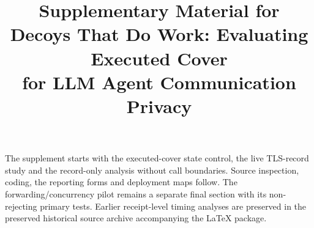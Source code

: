 \documentclass[conference,compsoc]{IEEEtran}
\title{Supplementary Material for\\Decoys That Do Work: Evaluating Executed Cover\\for LLM Agent Communication Privacy}
\author{}
\begin{document}

\raggedbottom
\pagestyle{plain}
\maketitle
\thispagestyle{plain}
\noindent The supplement starts with the executed-cover state control, the live TLS-record study and the record-only analysis without call boundaries. Source inspection, coding, the reporting forms and deployment maps follow. The forwarding/concurrency pilot remains a separate final section with its non-rejecting primary tests. Earlier receipt-level timing analyses are preserved in the preserved historical source archive accompanying the LaTeX package.

\clearpage
\clearpage
\clearpage\onecolumn\twocolumn






\clearpage
\clearpage\onecolumn\twocolumn


\end{document}
